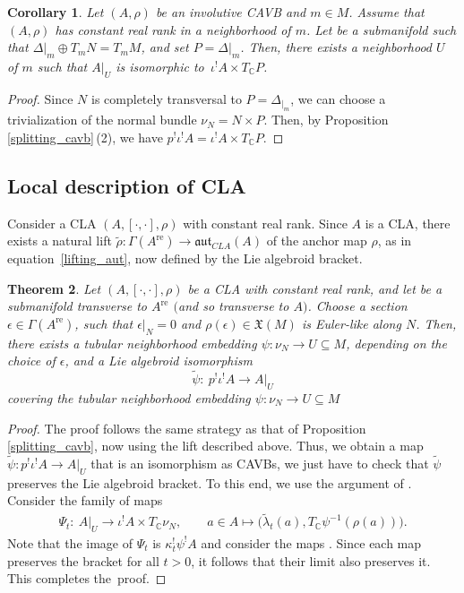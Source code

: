 \documentclass[pdftex]{sigma}
\numberwithin{equation}{section}
\newtheorem{Theorem}{Theorem}[section]
\newtheorem{Corollary}[Theorem]{Corollary}
\newcommand{\C}{{\mathbb{C}}}
\DeclareMathOperator{\real}{re}
\begin{document}
\begin{Corollary}%
Let $(A,\rho)$ be an involutive CAVB and $m\in M$. Assume that $(A,\rho)$ has constant real rank in a neighborhood of $m$. Let  be a submanifold such that $\Delta|_m\oplus T_m N=T_m M$, and set $P=\Delta{|_m}$. Then, there exists a neighborhood $U$ of $m$ such that $A{|_{U}}$ is isomorphic to~${\iota^! A\times T_{\C}P}$.
\end{Corollary}
\begin{proof}
Since $N$ is completely transversal to $P=\Delta_{|_m}$, we can choose a trivialization of the normal bundle $\nu_N=N\times P$. Then, by Proposition \ref{splitting_cavb}\,(2), we have
$p^!\iota^! A=\iota^! A\times T_{\C}P$.
\end{proof}

\subsection{Local description of CLA}%
Consider a CLA $(A, [\cdot,\cdot],\rho)$ with constant real rank. Since $A$ is a CLA, there exists a natural lift
$\widetilde{\rho}\colon \Gamma(A^{\real})\to \mathfrak{aut}_{CLA}(A)$ of the anchor map $\rho$, as in equation~\eqref{lifting_aut}, now defined by the Lie algebroid bracket.
\begin{Theorem}\label{splitting_CLA}
Let $(A,[\cdot,\cdot],\rho)$ be a CLA with constant real rank, and let  be a submanifold transverse to $A^{\real}$ $($and so transverse to $A)$. Choose a section $\epsilon\in \Gamma(A^{\real})$, such that $\epsilon|_N=0$ and $\rho(\epsilon)\in \mathfrak{X}(M)$ is Euler-like along $N$. Then, there exists a tubular neighborhood embedding $\psi\colon \nu_N\to U\subseteq M$, depending on the choice of $\epsilon$, and a Lie algebroid isomorphism
\[
\widetilde{\psi}\colon\ p^{!}\iota^{!}A\to A|_U
\]
  covering the tubular neighborhood embedding $\psi\colon \nu_N\to U\subseteq M$
\end{Theorem}
\begin{proof}
   The proof follows the same strategy as that of Proposition \ref{splitting_cavb}, now using the lift described above. Thus, we obtain a map $\widetilde{\psi}\colon p^{!}\iota^{!}A\xrightarrow{}A|_U$ that is an isomorphism as CAVBs, we just have to check that $\widetilde{\psi}$ preserves the Lie algebroid bracket. To this end, we use the argument of \cite[Remark 3.20]{bursztyn2019splitting}. Consider the family of maps
   \begin{align*}
   \Psi_t\colon \ A|_U \to \iota^! A\times T_{\C}\nu_N,\qquad
   a\in A \mapsto \bigl(\widetilde{\lambda}_t(a), T_{\C}\psi^{-1}(\rho(a))\bigr).
   \end{align*}
    Note that the image of $\Psi_t$ is $\kappa_t^! \psi^! A$ and consider the maps . Since each map  preserves the bracket for all $t>0$, it follows that their limit  also preserves it. This completes the~proof.
\end{proof}
\end{document}
